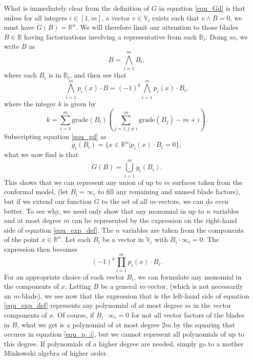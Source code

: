 \documentclass{ecgd-l}
\theoremstyle{definition}
\theoremstyle{remark}
\numberwithin{equation}{section}
\newcommand{\R}{\mathbb{R}}
\newcommand{\B}{\mathbb{B}}
\newcommand{\V}{\mathbb{V}}
\newcommand{\gd}{\dot{g}}
\newcommand{\Gd}{\dot{G}}
\newcommand{\nvai}{\infty}
\newcommand{\grade}{\mbox{grade}}
\begin{document}
What is immediately clear from the definition of $\Gd$ in equation \eqref{equ_Gd}
is that unless for all integers $i\in[1,m]$, a vector
$v\in\V_i$ exists such that $v\wedge B=0$, we must have $\Gd(B)=\R^n$.  We will therefore limit our attemtion
to those blades $B\in\B$ having factorizations involving a representative from each $\B_i$.
Doing so, we write $B$ as
\begin{equation}\label{equ_B_factored}
B = \bigwedge_{i=1}^m B_i,
\end{equation}
where each $B_i$ is in $\B_i$, and then see that
\begin{equation}\label{equ_exp_def}
\bigwedge_{i=1}^m p_i(x)\cdot B = (-1)^k\bigwedge_{i=1}^m p_i(x)\cdot B_i,
\end{equation}
where the integer $k$ is given by
\begin{equation}\label{equ_k}
k=\sum_{i=1}^m \grade(B_i)\left(\sum_{j=1,j\neq i}^m \grade(B_j)-m+i\right).
\end{equation}
Subscripting equation \eqref{equ_gd} as
\begin{equation*}
\gd_i(B_i) = \{x\in\R^n|p_i(x)\cdot B_i=0\},
\end{equation*}
what we now find is that
\begin{equation*}
\Gd(B) = \bigcup_{i=1}^m\gd_i(B_i).
\end{equation*}
This shows that we can represent any union of up to $m$ surfaces taken from the conformal model,
(let $B_i=\nvai_i$ to fill any remaining and unused blade factors),
but if we extend our function $\Gd$ to the set of all $m$-vectors, we can do even better.
To see why, we need only show that any monomial in up to $n$ variables and at most
degree $m$ can be represented by the expression on the right-hand side of equation \eqref{equ_exp_def}.
The $n$ variables are taken from the components of the point $x\in\R^n$.  Let each $B_i$ be a vector in $\V_i$
with $B_i\cdot\nvai_i=0$.
The expression then becomes
\begin{equation*}
(-1)^k\prod_{i=1}^m p_i(x)\cdot B_i.
\end{equation*}
For an appropriate choice of each vector $B_i$, we can formulate any
monomial in the components of $x$.
Letting $B$ be a general $m$-vector, (which is not necessarily an $m$-blade),
we see now that the expression
that is the left-hand side of equation \eqref{equ_exp_def} represents
any polynomial of at most degree $m$
in the vector components of $x$.
Of course, if $B_i\cdot\nvai_i=0$ for not all vector factors of the blades in $B$, what
we get is a polynomial of at most degree $2m$ by the squaring that
occures in equation \eqref{equ_p_i}, but we cannot represent all polynomials
of up to this degree.  If polynomials of a higher degree are needed, simply go to a
mother Minkowski algebra of higher order.
\end{document}
